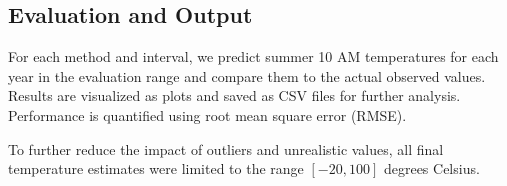 \subsection{Evaluation and Output}

For each method and interval, we predict summer 10 AM temperatures for each year in the evaluation range and compare them to the actual observed values. Results are visualized as plots and saved as CSV files for further analysis. Performance is quantified using root mean square error (RMSE).

To further reduce the impact of outliers and unrealistic values, all final temperature estimates were limited to the range $[-20, 100]$ degrees Celsius.